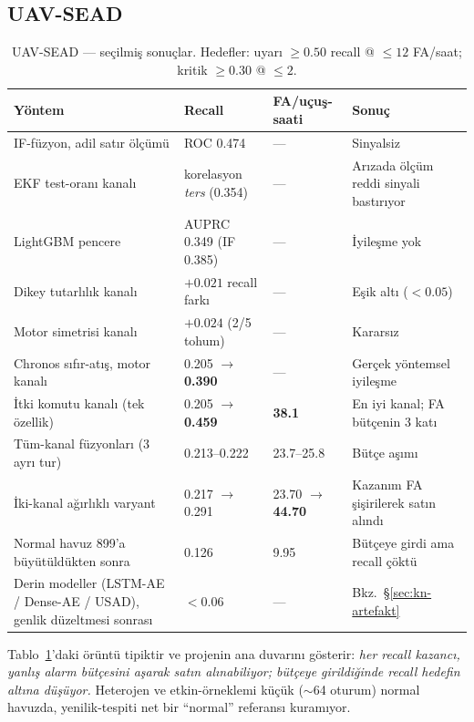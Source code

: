 \documentclass[11pt,a4paper]{article}
\begin{document}
\subsection{UAV-SEAD}
\label{sec:sead-sonuc}

\begin{table}[h]
\centering\small
\caption{UAV-SEAD --- seçilmiş sonuçlar. Hedefler: uyarı $\geq 0.50$ recall @
$\leq 12$ FA/saat; kritik $\geq 0.30$ @ $\leq 2$.}
\label{tab:sead-sonuclar}
\begin{tabular}{p{5.6cm}p{3.2cm}p{3.2cm}p{2.6cm}}
\toprule
Yöntem & Recall & FA/uçuş-saati & Sonuç \\
\midrule
IF-füzyon, adil satır ölçümü & ROC 0.474 & --- & Sinyalsiz \\
EKF test-oranı kanalı & korelasyon \emph{ters} (0.354) & --- & Arızada ölçüm
reddi sinyali bastırıyor \\
LightGBM pencere & AUPRC 0.349 (IF 0.385) & --- & İyileşme yok \\
Dikey tutarlılık kanalı & $+0.021$ recall farkı & --- & Eşik altı ($<0.05$) \\
Motor simetrisi kanalı & $+0.024$ (2/5 tohum) & --- & Kararsız \\
Chronos sıfır-atış, motor kanalı & 0.205 $\to$ \textbf{0.390} & --- &
Gerçek yöntemsel iyileşme \\
İtki komutu kanalı (tek özellik) & 0.205 $\to$ \textbf{0.459} & \textbf{38.1} &
En iyi kanal; FA bütçenin 3 katı \\
Tüm-kanal füzyonları (3 ayrı tur) & 0.213--0.222 & 23.7--25.8 & Bütçe aşımı \\
İki-kanal ağırlıklı varyant & 0.217 $\to$ 0.291 & 23.70 $\to$ \textbf{44.70} &
Kazanım FA şişirilerek satın alındı \\
Normal havuz 899'a büyütüldükten sonra & 0.126 & 9.95 & Bütçeye girdi ama
recall çöktü \\
Derin modeller (LSTM-AE / Dense-AE / USAD), genlik düzeltmesi sonrası &
$<0.06$ & --- & Bkz.\ \S\ref{sec:kn-artefakt} \\
\bottomrule
\end{tabular}
\end{table}

Tablo~\ref{tab:sead-sonuclar}'daki örüntü tipiktir ve projenin ana duvarını
gösterir: \emph{her recall
kazancı, yanlış alarm bütçesini aşarak satın alınabiliyor; bütçeye girildiğinde
recall hedefin altına düşüyor.} Heterojen ve etkin-örneklemi küçük ($\sim$64
oturum) normal havuzda, yenilik-tespiti net bir ``normal'' referansı kuramıyor.
\end{document}
